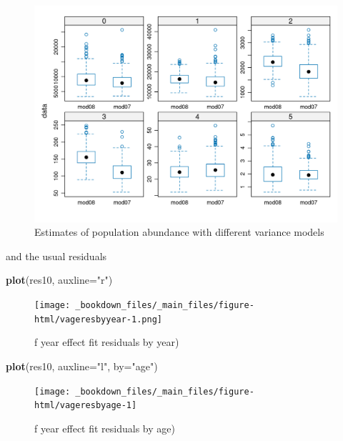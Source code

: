 \documentclass[
]{book}
\newenvironment{Shaded}{\begin{snugshade}}{\end{snugshade}}
\newcommand{\AttributeTok}[1]{\textcolor[rgb]{0.13,0.29,0.53}{#1}}
\newcommand{\FunctionTok}[1]{\textcolor[rgb]{0.13,0.29,0.53}{\textbf{#1}}}
\newcommand{\NormalTok}[1]{#1}
\newcommand{\StringTok}[1]{\textcolor[rgb]{0.31,0.60,0.02}{#1}}
\begin{document}
\begin{figure}
\centering
\includegraphics{_bookdown_files/_main_files/figure-html/vage-1.png}
\caption{\label{fig:vage}Estimates of population abundance with different variance models}
\end{figure}

and the usual residuals

\begin{Shaded}
\begin{Highlighting}[]
\FunctionTok{plot}\NormalTok{(res10, }\AttributeTok{auxline=}\StringTok{"r"}\NormalTok{)}
\end{Highlighting}
\end{Shaded}

\begin{figure}
\centering
\texttt{[image: \_bookdown\_files/\_main\_files/figure-html/vageresbyyear-1.png]}
\caption{\label{fig:vageresbyyear}f year effect fit residuals by year)}
\end{figure}

\begin{Shaded}
\begin{Highlighting}[]
\FunctionTok{plot}\NormalTok{(res10, }\AttributeTok{auxline=}\StringTok{"l"}\NormalTok{, }\AttributeTok{by=}\StringTok{"age"}\NormalTok{)}
\end{Highlighting}
\end{Shaded}

\begin{figure}
\texttt{[image: \_bookdown\_files/\_main\_files/figure-html/vageresbyage-1]} \caption{f year effect fit residuals by age)}\label{fig:vageresbyage}
\end{figure}
\end{document}
